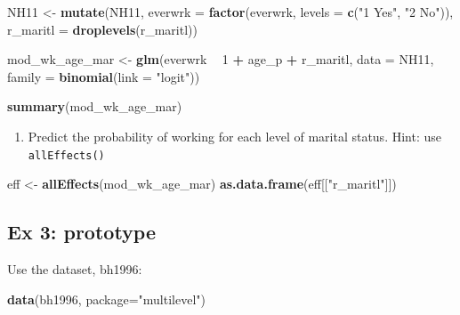 \documentclass[]{book}
\newenvironment{Shaded}{\begin{snugshade}}{\end{snugshade}}
\newcommand{\DataTypeTok}[1]{\textcolor[rgb]{0.13,0.29,0.53}{#1}}
\newcommand{\DecValTok}[1]{\textcolor[rgb]{0.00,0.00,0.81}{#1}}
\newcommand{\KeywordTok}[1]{\textcolor[rgb]{0.13,0.29,0.53}{\textbf{#1}}}
\newcommand{\NormalTok}[1]{#1}
\newcommand{\OperatorTok}[1]{\textcolor[rgb]{0.81,0.36,0.00}{\textbf{#1}}}
\newcommand{\StringTok}[1]{\textcolor[rgb]{0.31,0.60,0.02}{#1}}
\providecommand{\tightlist}{%
  \setlength{\itemsep}{0pt}\setlength{\parskip}{0pt}}
\begin{document}
\begin{Shaded}
\begin{Highlighting}[]
\NormalTok{  NH11 <-}\StringTok{ }\KeywordTok{mutate}\NormalTok{(NH11,}
                    \DataTypeTok{everwrk =} \KeywordTok{factor}\NormalTok{(everwrk, }\DataTypeTok{levels =} \KeywordTok{c}\NormalTok{(}\StringTok{"1 Yes"}\NormalTok{, }\StringTok{"2 No"}\NormalTok{)),}
                    \DataTypeTok{r_maritl =} \KeywordTok{droplevels}\NormalTok{(r_maritl))}

\NormalTok{  mod_wk_age_mar <-}\StringTok{ }\KeywordTok{glm}\NormalTok{(everwrk }\OperatorTok{~}\StringTok{ }\DecValTok{1} \OperatorTok{+}\StringTok{ }\NormalTok{age_p }\OperatorTok{+}\StringTok{ }\NormalTok{r_maritl, }\DataTypeTok{data =}\NormalTok{ NH11,}
                        \DataTypeTok{family =} \KeywordTok{binomial}\NormalTok{(}\DataTypeTok{link =} \StringTok{"logit"}\NormalTok{))}

  \KeywordTok{summary}\NormalTok{(mod_wk_age_mar)}
\end{Highlighting}
\end{Shaded}

\begin{enumerate}
\def\labelenumi{\arabic{enumi}.}
\setcounter{enumi}{1}
\tightlist
\item
  Predict the probability of working for each level of marital status. Hint: use \texttt{allEffects()}
\end{enumerate}

\begin{Shaded}
\begin{Highlighting}[]
\NormalTok{  eff <-}\StringTok{ }\KeywordTok{allEffects}\NormalTok{(mod_wk_age_mar)}
  \KeywordTok{as.data.frame}\NormalTok{(eff[[}\StringTok{"r_maritl"}\NormalTok{]])}
\end{Highlighting}
\end{Shaded}

\hypertarget{ex-3-prototype-1}{%
\subsection{Ex 3: prototype}\label{ex-3-prototype-1}}

Use the dataset, bh1996:

\begin{Shaded}
\begin{Highlighting}[]
  \KeywordTok{data}\NormalTok{(bh1996, }\DataTypeTok{package=}\StringTok{"multilevel"}\NormalTok{)}
\end{Highlighting}
\end{Shaded}
\end{document}
